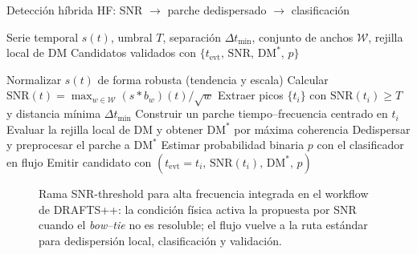 \begin{algorithm}[H]
\caption{Detección híbrida HF: SNR $\rightarrow$ parche dedispersado $\rightarrow$ clasificación}
\label{alg:hf-snr-class}
\begin{algorithmic}[1]
\Require Serie temporal $s(t)$, umbral $T$, separación $\Delta t_{\min}$, conjunto de anchos $\mathcal{W}$, rejilla local de DM
\Ensure Candidatos validados con $\{t_{\mathrm{evt}},\, \mathrm{SNR},\, \mathrm{DM}^*,\, p\}$

\State Normalizar $s(t)$ de forma robusta (tendencia y escala)
\State Calcular $\mathrm{SNR}(t)=\max_{w\in\mathcal{W}} (s*b_w)(t)/\sqrt{w}$
\State Extraer picos $\{t_i\}$ con $\mathrm{SNR}(t_i)\ge T$ y distancia mínima $\Delta t_{\min}$
    \State Construir un parche tiempo–frecuencia centrado en $t_i$
    \State Evaluar la rejilla local de DM y obtener $\mathrm{DM}^*$ por máxima coherencia
    \State Dedispersar y preprocesar el parche a $\mathrm{DM}^*$
    \State Estimar probabilidad binaria $p$ con el clasificador en flujo
        \State Emitir candidato con $(t_{\mathrm{evt}}\!=\!t_i,\, \mathrm{SNR}(t_i),\, \mathrm{DM}^*,\, p)$
    \EndIf
\EndFor
\end{algorithmic}
\end{algorithm}

\begin{figure}[H]
\centering
{}
\caption[Rama SNR en el workflow HF]{Rama SNR-threshold para alta frecuencia integrada en el workflow de DRAFTS++: la condición física activa la propuesta por SNR cuando el \textit{bow–tie} no es resoluble; el flujo vuelve a la ruta estándar para dedispersión local, clasificación y validación.}
\label{fig:hf-snr-branch}
\end{figure}

